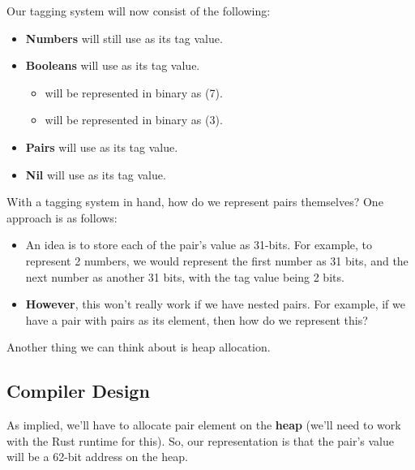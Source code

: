 \documentclass[letterpaper]{article}
\begin{document}
Our tagging system will now consist of the following:
\begin{itemize}
    \item \textbf{Numbers} will still use  as its tag value.
    \item \textbf{Booleans} will use  as its tag value. 
    \begin{itemize}
        \item {} will be represented in binary as  (7).
        \item {} will be represented in binary as  (3).
    \end{itemize}
    \item \textbf{Pairs} will use  as its tag value. 
    \item \textbf{Nil} will use  as its tag value.
\end{itemize}
With a tagging system in hand, how do we represent pairs themselves? One approach is as follows: 
\begin{itemize}
    \item An idea is to store each of the pair's value as 31-bits. For example, to represent 2 numbers, we would represent the first number as 31 bits, and the next number as another 31 bits, with the tag value being 2 bits. 
    \item \textbf{However}, this won't really work if we have nested pairs. For example, if we have a pair with pairs as its element, then how do we represent this? 
\end{itemize}
Another thing we can think about is heap allocation. 

\subsection{Compiler Design}
As implied, we'll have to allocate pair element on the \textbf{heap} (we'll need to work with the Rust runtime for this). So, our representation is that the pair's value will be a 62-bit address on the heap. 

\bigskip 
\end{document}
